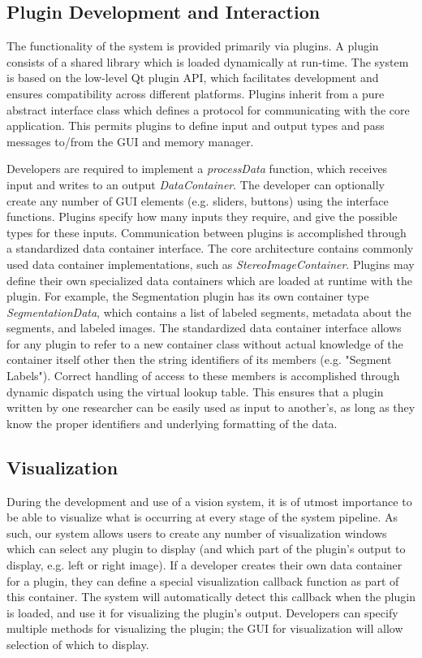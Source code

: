 \subsection{Plugin Development and Interaction}
The functionality of the system is provided primarily via plugins. A plugin consists of a shared library which is loaded dynamically at run-time. The system is based on the low-level Qt plugin API, which facilitates development and ensures compatibility across different platforms. Plugins inherit from a pure abstract interface class which defines a protocol for communicating with the core application. This permits plugins to define input and output types and pass messages to/from the GUI and memory manager. 

Developers are required to implement a \emph{processData} function, which receives input and writes to an output \emph{DataContainer}. The developer can optionally create any number of GUI elements (e.g. sliders, buttons) using the interface functions.  Plugins specify how many inputs they require, and give the possible types for these inputs. Communication between plugins is accomplished through a standardized data container interface. The core architecture contains commonly used data container implementations, such as \emph{StereoImageContainer}. Plugins may define their own specialized data containers which are loaded at runtime with the plugin. For example, the Segmentation plugin has its own container type \emph{SegmentationData}, which contains a list of labeled segments, metadata about the segments, and labeled images. The standardized data container interface allows for any plugin to refer to a new container class without actual knowledge of the container itself other then the string identifiers of 
its members (e.g. "Segment Labels"). Correct handling of access to these members is accomplished through dynamic dispatch using the virtual lookup table. This ensures that a plugin written by one researcher can be easily used as input to another's, as long as they know the proper identifiers and underlying formatting of the data. 


\subsection{Visualization}

During the development and use of a vision system, it is of utmost importance to be able to visualize what is occurring at every stage of the system pipeline. As such, our system allows users to create any number of visualization windows which can select any plugin to display (and which part of the plugin's output to display, e.g. left or right image). If a developer creates their own data container for a plugin, they can define a special visualization callback function as part of this container. The system will automatically detect this callback when the plugin is loaded, and use it for visualizing the plugin's output. Developers can specify multiple methods for visualizing the plugin; the GUI for visualization will allow selection of which to display.

